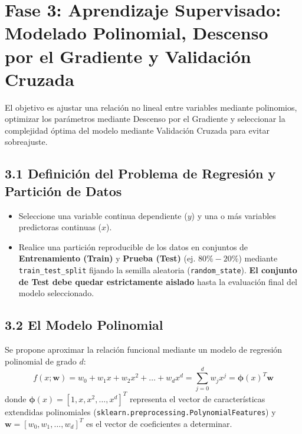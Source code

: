 \documentclass[11pt,a4paper]{article}
\begin{document}
\section{Fase 3: Aprendizaje Supervisado: Modelado Polinomial, Descenso por el Gradiente y Validación Cruzada}
\label{sec:fase3}

\begin{fasebox}
El objetivo es ajustar una relación no lineal entre variables mediante polinomios, optimizar los parámetros mediante Descenso por el Gradiente y seleccionar la complejidad óptima del modelo mediante Validación Cruzada para evitar sobreajuste.
\end{fasebox}

\subsection{3.1 Definición del Problema de Regresión y Partición de Datos}
\begin{itemize}[leftmargin=*,itemsep=2pt]
    \item Seleccione una variable continua dependiente ($y$) y una o más variables predictoras continuas ($x$).
    \item Realice una partición reproducible de los datos en conjuntos de \textbf{Entrenamiento (Train)} y \textbf{Prueba (Test)} (ej. $80\% - 20\%$) mediante \texttt{train\_test\_split} fijando la semilla aleatoria (\texttt{random\_state}). \textbf{El conjunto de Test debe quedar estrictamente aislado} hasta la evaluación final del modelo seleccionado.
\end{itemize}

\subsection{3.2 El Modelo Polinomial}
Se propone aproximar la relación funcional mediante un modelo de regresión polinomial de grado $d$:
\begin{equation}
    f(x; \mathbf{w}) = w_0 + w_1 x + w_2 x^2 + \dots + w_d x^d = \sum_{j=0}^d w_j x^j = \bm{\phi}(x)^T \mathbf{w}
\end{equation}
donde $\bm{\phi}(x) = [1, x, x^2, \dots, x^d]^T$ representa el vector de características extendidas polinomiales (\texttt{sklearn.preprocessing.PolynomialFeatures}) y $\mathbf{w} = [w_0, w_1, \dots, w_d]^T$ es el vector de coeficientes a determinar.
\end{document}
